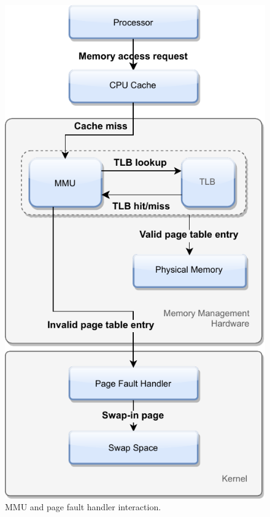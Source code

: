 \begin{figure}[tbp]
	\centering
	\includegraphics[]{implementation/mmu.pdf}
	\caption[MMU hardware]{MMU and page fault handler interaction.}
	\label{fig:mmu} 
\end{figure}


